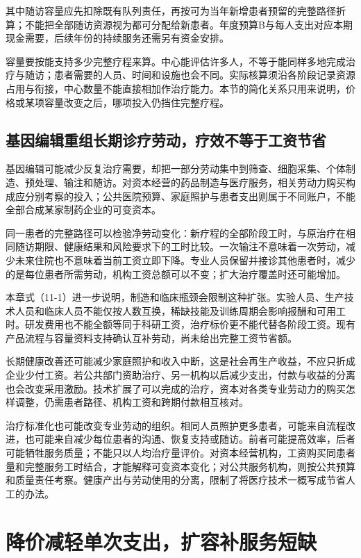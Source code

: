\documentclass[UTF8,fontset=windows,12pt,a4paper,oneside,openany]{ctexbook}
\begin{document}
其中随访容量应先扣除既有队列责任，再按可为当年新增患者预留的完整路径折算；不能把全部随访资源视为都可分配给新患者。年度预算B与每人支出对应本期现金需要，后续年份的持续服务还需另有资金安排。

容量要按能支持多少完整疗程来算。中心能评估许多人，不等于能同样多地完成治疗与随访；患者需要的人员、时间和设施也会不同。实际核算须沿各阶段记录资源占用与衔接，中心数量不能直接相加作治疗能力。本节的简化关系只用来说明，价格或某项容量改变之后，哪项投入仍挡住完整疗程。

\subsection{基因编辑重组长期诊疗劳动，疗效不等于工资节省}

基因编辑可能减少反复治疗需要，却把一部分劳动集中到筛查、细胞采集、个体制造、预处理、输注和随访。对资本经营的药品制造与医疗服务，相关劳动力购买构成应分别考察的投入；公共医院预算、家庭照护与患者支出则属于不同账户，不能全部合成某家制药企业的可变资本。

同一患者的完整路径可以检验净劳动变化：新疗程的全部阶段工时，与原治疗在相同随访期限、健康结果和风险要求下的工时比较。一次输注不意味着一次劳动，减少未来住院也不意味着当前工资立即下降。专业人员保留并接诊其他患者时，减少的是每位患者所需劳动，机构工资总额可以不变；扩大治疗覆盖时还可能增加。

本章式（11-1）进一步说明，制造和临床瓶颈会限制这种扩张。实验人员、生产技术人员和临床人员不能仅按人数互换，稀缺技能及训练周期会影响报酬和可用工时。研发费用也不能全额等同于科研工资，治疗标价更不能代替各阶段工资。现有产品流程与容量资料支持确认互补劳动，尚未给出完整工资节省额。

长期健康改善还可能减少家庭照护和收入中断，这是社会再生产收益，不应只折成企业少付工资。若公共部门资助治疗、另一机构以后减少支出，付款与收益的分离也会改变采用激励。技术扩展了可以完成的治疗，资本对各类专业劳动力的购买怎样调整，仍需患者路径、机构工资和跨期付款相互核对。

治疗标准化也可能改变专业劳动的组织。相同人员照护更多患者，可能来自流程改进，也可能来自减少每位患者的沟通、恢复支持或随访。前者可能提高效率，后者可能牺牲服务质量；不能只以人均治疗量评价。对资本经营机构，工资购买同患者量和完整服务工时结合，才能解释可变资本变化；对公共服务机构，则按公共预算和质量责任考察。健康产出与劳动使用的分离，限制了将医疗技术一概写成节省人工的办法。

\section{降价减轻单次支出，扩容补服务短缺}
\end{document}
